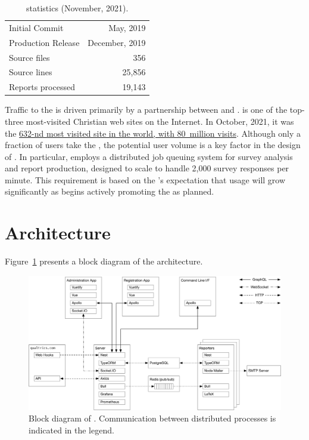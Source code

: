 \documentclass{article}
\begin{document}
\begin{table}
  \centering
  \begin{tabular}{lr}
    \toprule
    Initial Commit     & May, 2019      \\
    Production Release & December, 2019 \\
    \midrule
    Source files       & 356            \\
    Source lines       & 25,856         \\
    \midrule
    Reports processed  & 19,143         \\
    \bottomrule
  \end{tabular}
  \caption{\caper{} statistics (November, 2021).}
  \label{tab:caper-stats}
\end{table}

Traffic to the \cls{} is driven primarily by a partnership between \cfse{} and
\bg.
\bg{} is one of the top-three most-visited Christian web sites on the Internet.
In October, 2021, it was the
\href{https://www.similarweb.com/website/biblegateway.com/}{632-nd most visited site in the world,
  with 80~million visits}.
Although only a fraction of \bg{} users take the \cls,
the potential user volume is a key factor in the design of \caper.
In particular, \caper{} employs a distributed job queuing system
for survey analysis and report production,
designed to scale to handle 2,000 survey responses per minute.
This requirement is based on the \cfse{}'s
expectation that usage will grow significantly as \bg{}
begins actively promoting the \cls{} as planned.

\section{Architecture}
\label{sec:architecture}

Figure~\ref{fig:block-diagram}
presents a block diagram
of the \caper{} architecture.
\begin{figure}
  \centering
  \includegraphics[width=\textwidth]{block-diagram}
  \caption{Block diagram of \caper.
    Communication between distributed processes is indicated in the legend.}
  \label{fig:block-diagram}
\end{figure}
\end{document}
